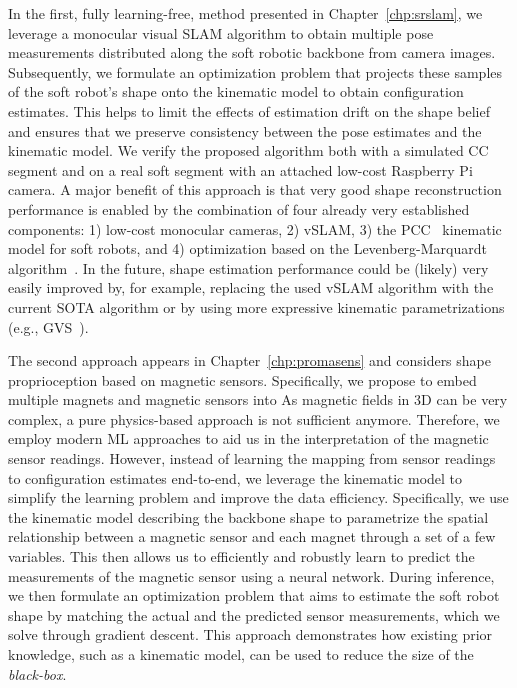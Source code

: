 In the first, fully learning-free, method presented in Chapter~\ref{chp:srslam}, we leverage a monocular visual \gls{SLAM} algorithm to obtain multiple pose measurements distributed along the soft robotic backbone from camera images. Subsequently, we formulate an optimization problem that projects these samples of the soft robot's shape onto the kinematic model to obtain configuration estimates. This helps to limit the effects of estimation drift on the shape belief and ensures that we preserve consistency between the pose estimates and the kinematic model. 
We verify the proposed algorithm both with a simulated \gls{CC} segment and on a real soft segment with an attached low-cost Raspberry Pi camera.
A major benefit of this approach is that very good shape reconstruction performance is enabled by the combination of four already very established components: 1) low-cost monocular cameras, 2) \gls{vSLAM}, 3) the \gls{PCC}~\cite{webster2010design} kinematic model for soft robots, and 4) optimization based on the Levenberg-Marquardt algorithm~\cite{levenberg1944method, marquardt1963algorithm}.
In the future, shape estimation performance could be (likely) very easily improved by, for example, replacing the used \gls{vSLAM} algorithm with the current \gls{SOTA} algorithm or by using more expressive kinematic parametrizations (e.g., \gls{GVS}~\cite{renda2020geometric}).


The second approach appears in Chapter~\ref{chp:promasens} and considers shape proprioception based on magnetic sensors. 
Specifically, we propose to embed multiple magnets and magnetic sensors into 
As magnetic fields in 3D can be very complex, a pure physics-based approach is not sufficient anymore. Therefore, we employ modern \gls{ML} approaches to aid us in the interpretation of the magnetic sensor readings. However, instead of learning the mapping from sensor readings to configuration estimates end-to-end, we leverage the kinematic model to simplify the learning problem and improve the data efficiency. Specifically, we use the kinematic model describing the backbone shape to parametrize the spatial relationship between a magnetic sensor and each magnet through a set of a few variables. 
This then allows us to efficiently and robustly learn to predict the measurements of the magnetic sensor using a neural network. During inference, we then formulate an optimization problem that aims to estimate the soft robot shape by matching the actual and the predicted sensor measurements, which we solve through gradient descent.
This approach demonstrates how existing prior knowledge, such as a kinematic model, can be used to reduce the size of the \emph{black-box}.


